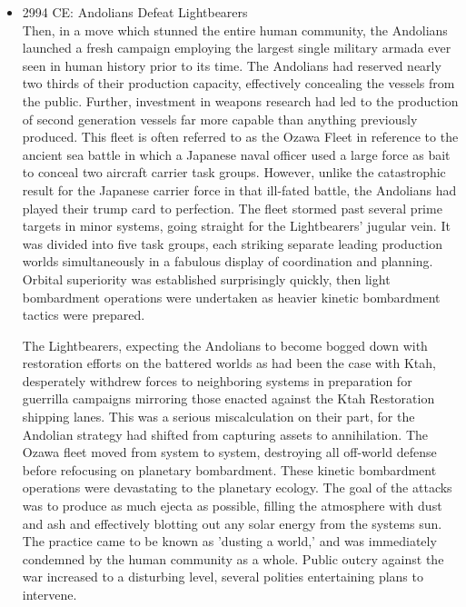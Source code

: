 \begin{itemize}
\item 2994 CE: Andolians Defeat Lightbearers \\

Then, in a move which stunned the entire human community, the
Andolians launched a fresh campaign employing the largest single
military armada ever seen in human history prior to its time.  The
Andolians had reserved nearly two thirds of their production capacity,
effectively concealing the vessels from the public.  Further,
investment in weapons research had led to the production of second
generation vessels far more capable than anything previously produced.
This fleet is often referred to as the Ozawa Fleet in reference to the
ancient sea battle in which a Japanese naval officer used a large
force as bait to conceal two aircraft carrier task groups.  However,
unlike the catastrophic result for the Japanese carrier force in that
ill-fated battle, the Andolians had played their trump card to
perfection.  The fleet stormed past several prime targets in minor
systems, going straight for the Lightbearers' jugular vein.  It was
divided into five task groups, each striking separate leading
production worlds simultaneously in a fabulous display of coordination
and planning.  Orbital superiority was established surprisingly
quickly, then light bombardment operations were undertaken as heavier
kinetic bombardment tactics were prepared.

The Lightbearers, expecting the Andolians to become bogged down with
restoration efforts on the battered worlds as had been the case with
Ktah, desperately withdrew forces to neighboring systems in
preparation for guerrilla campaigns mirroring those enacted against the
Ktah Restoration shipping lanes.  This was a serious miscalculation on
their part, for the Andolian strategy had shifted from capturing
assets to annihilation.  The Ozawa fleet moved from system to system,
destroying all off-world defense before refocusing on planetary
bombardment.  These kinetic bombardment operations were devastating to
the planetary ecology.  The goal of the attacks was to produce as much
ejecta as possible, filling the atmosphere with dust and ash and
effectively blotting out any solar energy from the systems sun.  The
practice came to be known as 'dusting a world,' and was immediately
condemned by the human community as a whole.  Public outcry against
the war increased to a disturbing level, several polities entertaining
plans to intervene.


\end{itemize}
